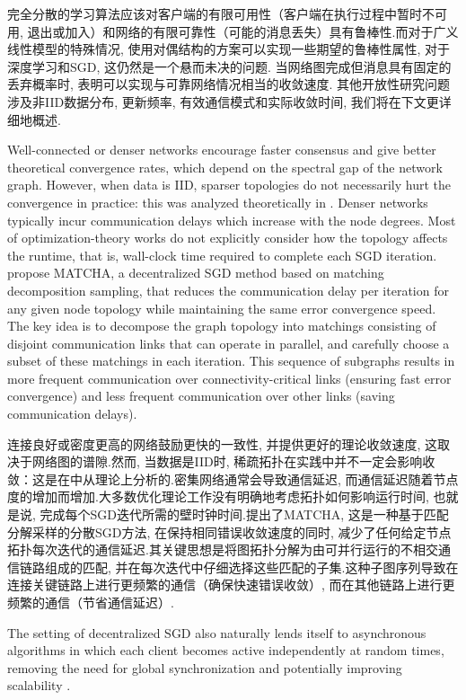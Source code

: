 完全分散的学习算法应该对客户端的有限可用性（客户端在执行过程中暂时不可用, 退出或加入）和网络的有限可靠性（可能的消息丢失）具有鲁棒性.而对于广义线性模型的特殊情况, 使用对偶结构的方案可以实现一些期望的鲁棒性属性, 对于深度学习和SGD, 这仍然是一个悬而未决的问题.
当网络图完成但消息具有固定的丢弃概率时, \citet{yu2018distributed}表明可以实现与可靠网络情况相当的收敛速度.
其他开放性研究问题涉及非IID数据分布, 更新频率, 有效通信模式和实际收敛时间\citep{Tang2018}, 我们将在下文更详细地概述.

Well-connected or denser networks encourage faster consensus and give better theoretical convergence rates, which depend on the spectral gap of the network graph. However, when data is IID, sparser topologies do not necessarily hurt the convergence in practice: this was analyzed theoretically in \cite{neglia2020}. Denser networks typically incur communication delays which increase with the node degrees. Most of optimization-theory works do not explicitly consider how the topology affects the runtime, that is, wall-clock time required to complete each SGD iteration. \citet{wang2019matcha} propose MATCHA, a decentralized SGD method based on matching decomposition sampling, that reduces the communication delay per iteration for any given node topology while maintaining the same error convergence speed. The key idea is to decompose the graph topology into matchings consisting of disjoint communication links that can operate in parallel, and carefully choose a subset of these matchings in each iteration. This sequence of subgraphs results in more frequent communication over connectivity-critical links (ensuring fast error convergence) and less frequent communication over other links (saving communication delays).

连接良好或密度更高的网络鼓励更快的一致性, 并提供更好的理论收敛速度, 这取决于网络图的谱隙.然而, 当数据是IID时, 稀疏拓扑在实践中并不一定会影响收敛：这是在\cite{neglia2020}中从理论上分析的.密集网络通常会导致通信延迟, 而通信延迟随着节点度的增加而增加.大多数优化理论工作没有明确地考虑拓扑如何影响运行时间, 也就是说, 完成每个SGD迭代所需的壁时钟时间.\citet{wang2019matcha}提出了MATCHA, 这是一种基于匹配分解采样的分散SGD方法, 在保持相同错误收敛速度的同时, 减少了任何给定节点拓扑每次迭代的通信延迟.其关键思想是将图拓扑分解为由可并行运行的不相交通信链路组成的匹配, 并在每次迭代中仔细选择这些匹配的子集.这种子图序列导致在连接关键链路上进行更频繁的通信（确保快速错误收敛）, 而在其他链路上进行更频繁的通信（节省通信延迟）.


The setting of decentralized SGD also naturally lends itself to asynchronous algorithms in which each client becomes active independently at random times, removing the need for global synchronization and potentially improving scalability \citep{Colin2016,Vanhaesebrouck2017,Bellet2018a,assran2019stochastic,Lian2018}.

